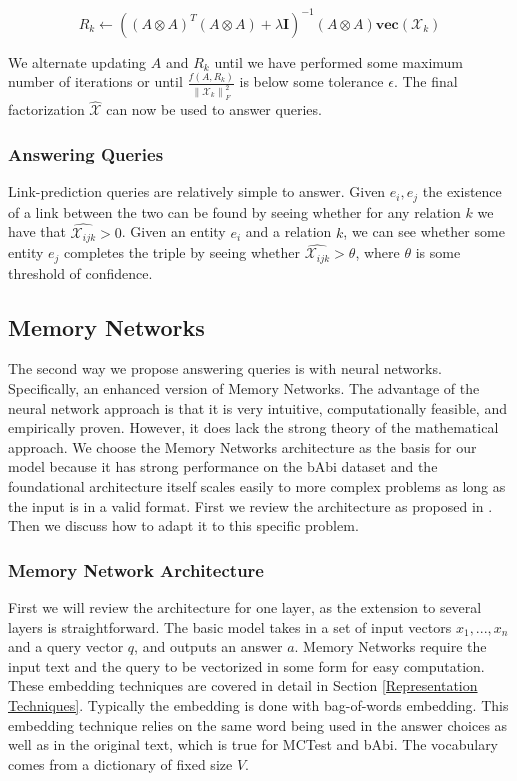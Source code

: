\documentclass[pageno]{jpaper}
\newcommand{\norm}[1]{\left\lVert#1\right\rVert}
\begin{document}
$$R_k \leftarrow \left( \left(A \otimes A \right)^T \left(A \otimes A\right) + \lambda\textbf{I}
 \right) ^{-1} \left(A \otimes A\right) \textbf{vec}\left(\mathcal{X}_k\right)$$

We alternate updating $A$ and $R_k$ until we have performed some maximum number
of iterations or until $\frac{f(A, R_k)}{\norm{\mathcal{X}_k}_F^2}$ is below
some tolerance $\epsilon$. The final factorization $\hat{\mathcal{X}}$ can now
be used to answer queries.

\subsubsection{Answering Queries}
\label{Answering Queries}

Link-prediction queries are relatively simple to answer. Given $e_i, e_j$
the existence of a link between the two can be found by seeing whether for any
relation $k$ we have that $\hat{\mathcal{X}_{ijk}} > 0$. Given an entity $e_i$ and a relation
$k$, we can see whether some entity $e_j$ completes the triple by seeing whether
$\hat{\mathcal{X}_{ijk}} > \theta$, where $\theta$ is some threshold of confidence.

\subsection{Memory Networks}
\label{Memory Networks}

The second way we propose answering queries is with neural networks.
Specifically, an enhanced version of Memory Networks. The advantage of the
neural network approach is that it is very intuitive, computationally feasible,
and empirically proven. However, it does lack the strong theory of the
mathematical approach. We choose the Memory Networks architecture as the basis
for our model because it has strong performance on the bAbi dataset and the
foundational architecture itself scales easily to more complex problems as long
as the input is in a valid format. First we review the architecture as proposed
in \cite{Sukhbaatar2015}. Then we discuss how to adapt it to this specific
problem. \\

\subsubsection{Memory Network Architecture}
\label{Memory Network Architecture}

First we will review the architecture for one layer, as the extension to several
layers is straightforward. The basic model takes in a set of input vectors $x_1, ...,
x_n$ and a query vector $q$, and outputs an answer $a$. Memory Networks require
the input text and the query to be vectorized in some form for easy computation.
These embedding techniques are covered in detail in Section \ref{Representation
Techniques}. Typically the embedding is done with bag-of-words embedding. This
embedding technique relies on the same word being used in the answer choices as
well as in the original text, which is true for MCTest and bAbi. The vocabulary
comes from a dictionary of fixed size $V$.
\end{document}
